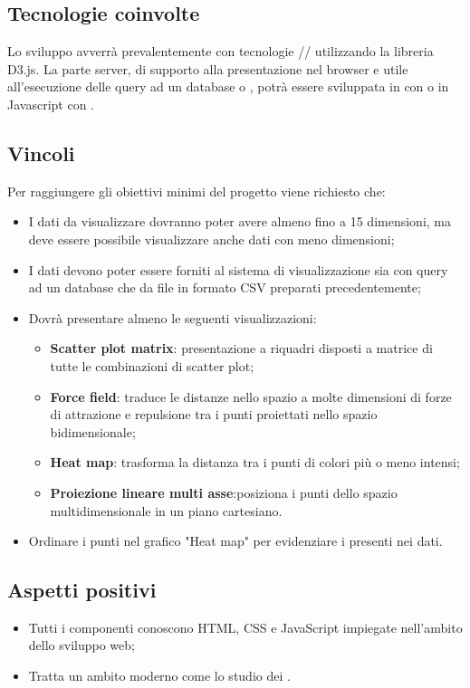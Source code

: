 \subsection{Tecnologie coinvolte}
Lo sviluppo avverrà prevalentemente con tecnologie // utilizzando la libreria D3.js.
La parte server, di supporto alla presentazione nel browser e utile all'esecuzione delle query ad un database  o , potrà essere sviluppata in  con  o in Javascript con .

\subsection{Vincoli}
Per raggiungere gli obiettivi minimi del progetto viene richiesto che:
\begin{itemize}
	\item I dati da visualizzare dovranno poter avere almeno fino a 15 dimensioni, ma deve essere possibile visualizzare anche dati con meno dimensioni;
	\item I dati devono poter essere forniti al sistema di visualizzazione sia con query ad un database che da file in formato CSV preparati precedentemente;
	\item Dovrà presentare almeno le seguenti visualizzazioni:
	\begin{itemize}
		\item \textbf{Scatter plot matrix}: presentazione a riquadri disposti a matrice di tutte le combinazioni di scatter plot;
		\item \textbf{Force field}: traduce le distanze nello spazio a molte dimensioni di forze di attrazione e repulsione tra i punti proiettati nello spazio bidimensionale;
		\item \textbf{Heat map}: trasforma la distanza tra i punti di colori più o meno intensi;
		\item \textbf{Proiezione lineare multi asse}:posiziona i punti dello spazio multidimensionale in un piano
		cartesiano.
	\end{itemize}
	\item Ordinare i punti nel grafico "Heat map" per evidenziare i  presenti nei dati.
\end{itemize}

\subsection{Aspetti positivi}
\begin{itemize}
	\item Tutti i componenti conoscono HTML, CSS e JavaScript impiegate nell'ambito dello sviluppo web;
	\item Tratta un ambito moderno come lo studio dei .
\end{itemize}

